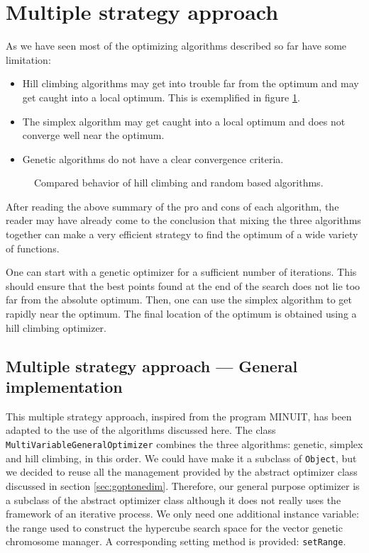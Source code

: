 \documentclass[twoside]{book}
\begin{document}
\section{Multiple strategy approach}
\label{sec:multistrategy} As we have seen most of the optimizing
algorithms described so far have some limitation:
\begin{itemize}
  \item Hill climbing algorithms may get into trouble far from the
  optimum and may get caught into a local optimum. This is exemplified in figure \ref{fig:hillvsrandom}.
  \item The simplex algorithm may get caught into a local optimum
  and does not converge well near the optimum.
  \item Genetic algorithms do not have a clear convergence
  criteria.
\end{itemize}
\begin{figure}
\center{}
\caption{Compared behavior of hill climbing and random based algorithms.}\label{fig:hillvsrandom}
\end{figure}
After reading the above summary of the pro and cons of each
algorithm, the reader may have already come to the conclusion that
mixing the three algorithms together can make a very efficient
strategy to find the optimum of a wide variety of functions.

One can start with a genetic optimizer for a sufficient number of
iterations. This should ensure that the best points found at the
end of the search does not lie too far from the absolute optimum.
Then, one can use the simplex algorithm to get rapidly near the
optimum. The final location of the optimum is obtained using a
hill climbing optimizer.

\subsection{Multiple strategy approach --- General implementation}
This multiple strategy approach, inspired from the program MINUIT,
has been adapted to the use of the algorithms discussed here. The
class {\tt MultiVariableGeneralOptimizer} combines the three
algorithms: genetic, simplex and hill climbing, in this order. We
could have make it a subclass of {\tt Object}, but we decided to
reuse all the management provided by the abstract optimizer class
discussed in section \ref{sec:goptonedim}. Therefore, our general
purpose optimizer is a subclass of the abstract optimizer class
although it does not really uses the framework of an iterative
process. We only need one additional instance variable: the range
used to construct the hypercube search space for the vector
genetic chromosome manager. A corresponding setting method is
provided: {\tt setRange}.
\end{document}
